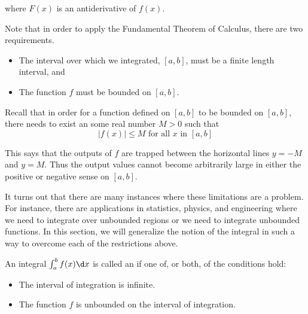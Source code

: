 \documentclass{ximera}
\begin{document}
where $F(x)$ is an antiderivative of $f(x)$.

Note that in order to apply the Fundamental Theorem of Calculus, there are two requirements.

\begin{itemize}
\item The interval over which we integrated, $[a,b]$, must be a finite length
  interval, and
\item The function $f$ must be bounded on $[a,b]$.
\end{itemize}


\begin{remark}
Recall that in order for a function defined on $[a, b]$ to be bounded on $[a,b]$, there needs to exist an some real number $M>0$ such that 
\[
|f(x)| \leq M \text{ for all } x \text{ in } [a, b]
\]

This says that the outputs of $f$ are trapped between the horizontal lines $y=-M$ and $y=M$. Thus the output values cannot 
become arbitrarily large in either the positive or negative sense on $[a,b]$. 
\end{remark}


It turns out that there are many instances where these limitations are a problem.  For instance, there are applications in statistics, physics, and engineering where we need to integrate over unbounded regions or we need to integrate unbounded functions.  In this section, we will generalize the notion of the integral in such a way to overcome each of the restrictions above.



\begin{definition}
  An integral $\int_a^b f(x) \d x $
  is called an  if one of, or both, of the conditions hold:
  \begin{itemize}
  \item The interval of integration is infinite.
  \item The function $f$ is unbounded on the interval of integration.
  \end{itemize}
\end{definition}
\end{document}
